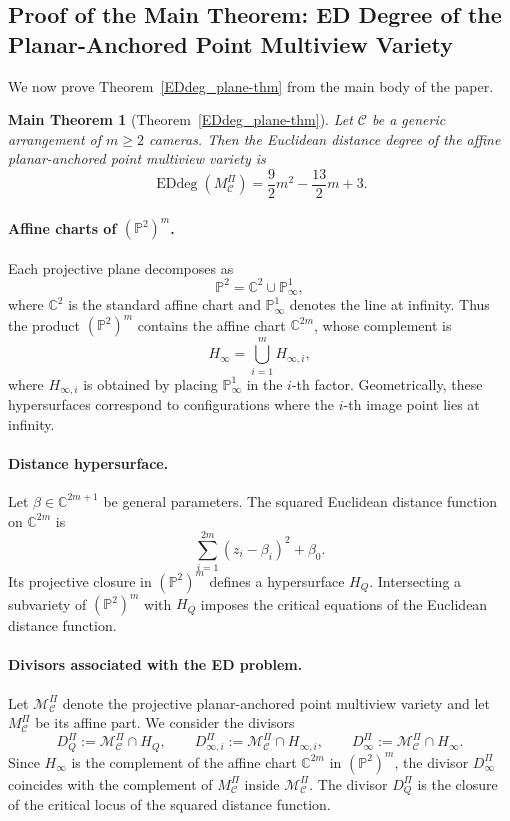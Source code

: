 \documentclass{article}
\newtheorem*{maintheorem}{Main Theorem}
\newcommand{\CC}{\mathbb{C}}
\newcommand{\PP}{\mathbb{P}}
\begin{document}
\subsection{Proof of the Main Theorem: ED Degree of the Planar-Anchored Point Multiview Variety}

We now prove Theorem~\ref{EDdeg_plane-thm} from the main body of the paper.

\begin{maintheorem}[Theorem~\ref{EDdeg_plane-thm}]\label{maintheorem}
Let $\mathcal{C}$ be a generic arrangement of $m \ge 2$ cameras. Then the Euclidean distance degree of the affine planar-anchored point multiview variety is
\[
\operatorname{EDdeg}\!\left(M_\mathcal{C}^{\Pi}\right)
=
\frac{9}{2}m^{2}
-
\frac{13}{2}m
+
3 .
\]
\end{maintheorem}

\paragraph{Affine charts of $(\PP^2)^m$.}

Each projective plane decomposes as
\[
\PP^2 = \CC^2 \cup \PP^1_\infty,
\]
where $\CC^2$ is the standard affine chart and $\PP^1_\infty$ denotes the line at infinity. 
Thus the product $(\PP^2)^m$ contains the affine chart $\CC^{2m}$, whose complement is
\[
H_\infty = \bigcup_{i=1}^{m} H_{\infty,i},
\]
where $H_{\infty,i}$ is obtained by placing $\PP^1_\infty$ in the $i$-th factor. 
Geometrically, these hypersurfaces correspond to configurations where the $i$-th image point lies at infinity.

\paragraph{Distance hypersurface.}

Let $\beta \in \CC^{2m+1}$ be general parameters. The squared Euclidean distance function on $\CC^{2m}$ is
\[
\sum_{i=1}^{2m} (z_i - \beta_i)^2 + \beta_0 .
\]
Its projective closure in $(\PP^2)^m$ defines a hypersurface $H_Q$. 
Intersecting a subvariety of $(\PP^2)^m$ with $H_Q$ imposes the critical equations of the Euclidean distance function.

\paragraph{Divisors associated with the ED problem.}

Let $\mathcal{M}^\Pi_{\mathcal C}$ denote the projective planar-anchored point multiview variety and let $M^\Pi_{\mathcal C}$ be its affine part. 
We consider the divisors
\[
D_Q^\Pi := \mathcal{M}^\Pi_{\mathcal C} \cap H_Q, \qquad
D_{\infty,i}^\Pi := \mathcal{M}^\Pi_{\mathcal C} \cap H_{\infty,i}, \qquad
D_\infty^\Pi := \mathcal{M}^\Pi_{\mathcal C} \cap H_\infty .
\]
Since $H_\infty$ is the complement of the affine chart $\CC^{2m}$ in $(\PP^2)^m$, the divisor $D_\infty^\Pi$ coincides with the complement of $M^\Pi_{\mathcal C}$ inside $\mathcal{M}^\Pi_{\mathcal C}$. 
The divisor $D_Q^\Pi$ is the closure of the critical locus of the squared distance function.
\end{document}
